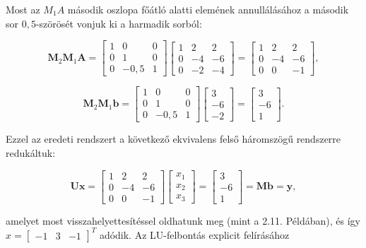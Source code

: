 \documentclass[
  magyar,
  11pt]{article}
\providecommand{\boldsymbol}[1]{\mathbf{#1}}
\begin{document}
Most az \(M_1 A\) második oszlopa főátló alatti elemének annullálásához
a második sor \(0{,}5\)-szörösét vonjuk ki a harmadik sorból:

\[\mathbf{M}_{2}\mathbf{M}_{1}\mathbf{A} = \begin{bmatrix} 1 & 0 & 0 \\ 0 & 1 & 0 \\ 0 & -0{,}5 & 1 \end{bmatrix} \begin{bmatrix} 1 & 2 & 2 \\ 0 & -4 & -6 \\ 0 & -2 & -4 \end{bmatrix} = \begin{bmatrix} 1 & 2 & 2 \\ 0 & -4 & -6 \\ 0 & 0 & -1 \end{bmatrix},\]

\[\mathbf{M}_{2}\mathbf{M}_{1}\mathbf{b} = \begin{bmatrix} 1 & 0 & 0 \\ 0 & 1 & 0 \\ 0 & -0{,}5 & 1 \end{bmatrix} \begin{bmatrix} 3 \\ -6 \\ -2 \end{bmatrix} = \begin{bmatrix} 3 \\ -6 \\ 1 \end{bmatrix}.\]

Ezzel az eredeti rendszert a következő ekvivalens felső háromszögű
rendszerre redukáltuk:

\[\boldsymbol{U}\boldsymbol{x} = \begin{bmatrix} 1 & 2 & 2 \\ 0 & -4 & -6 \\ 0 & 0 & -1 \end{bmatrix} \begin{bmatrix} x_1 \\ x_2 \\ x_3 \end{bmatrix} = \begin{bmatrix} 3 \\ -6 \\ 1 \end{bmatrix} = \boldsymbol{M}\boldsymbol{b} = \boldsymbol{y},\]

amelyet most visszahelyettesítéssel oldhatunk meg (mint a 2.11.
Példában), és így \(x = \begin{bmatrix} -1 & 3 & -1 \end{bmatrix}^T\)
adódik. Az LU-felbontás explicit felírásához
\end{document}
